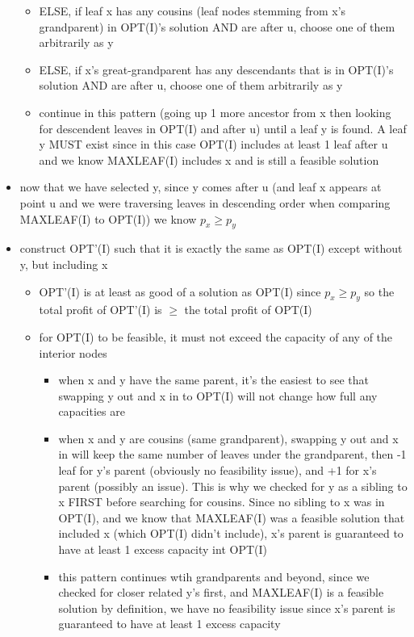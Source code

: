 \documentclass[a4paper]{article}
\begin{document}
\begin{itemize}
\begin{itemize}
        \item ELSE, if leaf x has any cousins (leaf nodes stemming from x's grandparent) in OPT(I)'s solution AND are after u, choose one of them arbitrarily as y
        \item ELSE, if x's great-grandparent has any descendants that is in OPT(I)'s solution AND are after u, choose one of them arbitrarily as y
        \item continue in this pattern (going up 1 more ancestor from x then looking for descendent leaves in OPT(I) and after u) until a leaf y is found. A leaf y MUST exist since in this case OPT(I) includes at least 1 leaf after u and we know MAXLEAF(I) includes x and is still a feasible solution
    \end{itemize}
    \item now that we have selected y, since y comes after u (and leaf x appears at point u and we were traversing leaves in descending order when comparing MAXLEAF(I) to OPT(I)) we know $p_x \geq p_y$
    \item construct OPT'(I) such that it is exactly the same as OPT(I) except without y, but including x
    \begin{itemize}
        \item OPT'(I) is at least as good of a solution as OPT(I) since $p_x \geq p_y$ so the total profit of OPT'(I) is $\geq$ the total profit of OPT(I)
        \item for OPT(I) to be feasible, it must not exceed the capacity of any of the interior nodes
        \begin{itemize}
            \item when x and y have the same parent, it's the easiest to see that swapping y out and x in to OPT(I) will not change how full any capacities are
            \item when x and y are cousins (same grandparent), swapping y out and x in will keep the same number of leaves under the grandparent, then -1 leaf for y's parent (obviously no feasibility issue), and +1 for x's parent (possibly an issue). This is why we checked for y as a sibling to x FIRST before searching for cousins. Since no sibling to x was in OPT(I), and we know that MAXLEAF(I) was a feasible solution that included x (which OPT(I) didn't include), x's parent is guaranteed to have at least 1 excess capacity int OPT(I)
            \item this pattern continues wtih grandparents and beyond, since we checked for closer related y's first, and MAXLEAF(I) is a feasible solution by definition, we have no feasibility issue since x's parent is guaranteed to have at least 1 excess capacity

\end{itemize}
\end{itemize}
\end{itemize}
\end{document}
